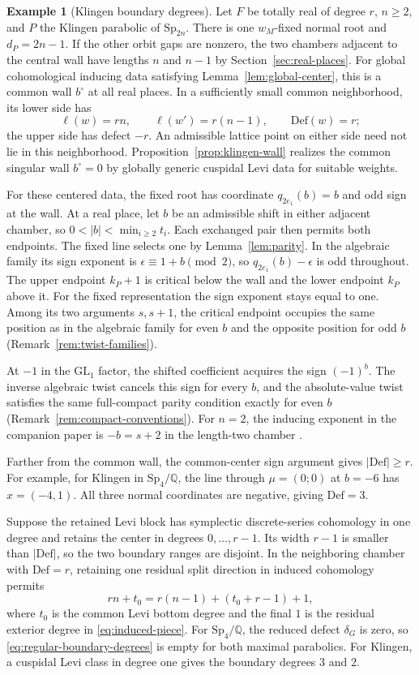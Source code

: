 \documentclass[12pt]{amsart}
\numberwithin{equation}{section}
\theoremstyle{plain}
\theoremstyle{definition}
\newtheorem{example}[theorem]{Example}
\theoremstyle{remark}
\newcommand{\Q}{\mathbb Q}
\newcommand{\GL}{\mathrm{GL}}
\newcommand{\Sp}{\mathrm{Sp}}
\newcommand{\Def}{\mathrm{Def}}
\begin{document}
\begin{example}[Klingen boundary degrees] \label{ex:klingen-mismatch}
Let $F$ be totally real of degree $r$, $n\ge2$, and $P$ the Klingen parabolic of $\Sp_{2n}$. There is one $w_M$-fixed normal root and $d_P=2n-1$. If the other orbit gaps are nonzero, the two chambers adjacent to the central wall have lengths $n$ and $n-1$ by Section~\ref{sec:real-places}. For global cohomological inducing data satisfying Lemma~\ref{lem:global-center}, this is a common wall $b^\circ$ at all real places. In a sufficiently small common neighborhood, its lower side has
\[
 \ell(w)=rn,\qquad \ell(w')=r(n-1),\qquad\Def(w)=r;
\]
the upper side has defect $-r$. An admissible lattice point on either side need not lie in this neighborhood. Proposition~\ref{prop:klingen-wall} realizes the common singular wall $b^\circ=0$ by globally generic cuspidal Levi data for suitable weights.

For these centered data, the fixed root has coordinate $q_{2e_1}(b)=b$ and odd sign at the wall. At a real place, let $b$ be an admissible shift in either adjacent chamber, so $0<|b|<\min_{i\ge2}t_i$. Each exchanged pair then permits both endpoints. The fixed line selects one by Lemma~\ref{lem:parity}. In the algebraic family its sign exponent is $\epsilon\equiv1+b\pmod2$, so $q_{2e_1}(b)-\epsilon$ is odd throughout. The upper endpoint $k_P+1$ is critical below the wall and the lower endpoint $k_P$ above it. For the fixed representation the sign exponent stays equal to one. Among its two arguments $s,s+1$, the critical endpoint occupies the same position as in the algebraic family for even $b$ and the opposite position for odd $b$ (Remark~\ref{rem:twist-families}).

At $-1$ in the $\GL_1$ factor, the shifted coefficient acquires the sign $(-1)^b$. The inverse algebraic twist cancels this sign for every $b$, and the absolute-value twist satisfies the same full-compact parity condition exactly for even $b$ (Remark~\ref{rem:compact-conventions}). For $n=2$, the inducing exponent in the companion paper is $-b=s+2$ in the length-two chamber \cite{HosseiniJafariKlingen}.

Farther from the common wall, the common-center sign argument gives $|\Def|\ge r$. For example, for Klingen in $\Sp_4/\Q$, the line through $\mu=(0;0)$ at $b=-6$ has $x=(-4,1)$. All three normal coordinates are negative, giving $\Def=3$.

Suppose the retained Levi block has symplectic discrete-series cohomology in one degree and retains the center in degrees $0,\ldots,r-1$. Its width $r-1$ is smaller than $|\Def|$, so the two boundary ranges are disjoint. In the neighboring chamber with $\Def=r$, retaining one residual split direction in induced cohomology permits  
\[
 rn+t_0=r(n-1)+(t_0+r-1)+1,
\]
where $t_0$ is the common Levi bottom degree and the final $1$ is the residual exterior degree in \eqref{eq:induced-piece}. For $\Sp_4/\Q$, the reduced defect $\delta_G$ is zero, so \eqref{eq:regular-boundary-degrees} is empty for both maximal parabolics. For Klingen, a cuspidal Levi class in degree one gives the boundary degrees $3$ and $2$. 
\end{example}
\end{document}
